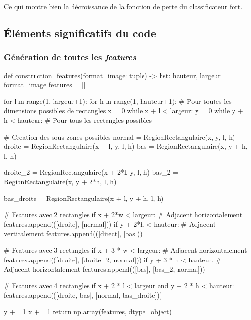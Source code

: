 \documentclass[12pt,a4paper]{article}
\begin{document}
Ce qui montre bien la décroissance de la fonction de perte du classificateur fort.

\subsection{Éléments significatifs du code}
\subsubsection{Génération de toutes les \textit{features}}
\label{sec:construction-features}

\begin{python}
def construction_features(format_image: tuple) -> list:
    hauteur, largeur = format_image
    features = []

    for l in range(1, largeur+1):
        for h in range(1, hauteur+1):
            # Pour toutes les dimensions possibles de rectangles
            x = 0
            while x + l < largeur:
                y = 0
                while y + h < hauteur:
                    # Pour tous les rectangles possibles
                    
                    # Creation des sous-zones possibles
                    normal = RegionRectangulaire(x, y, l, h)
                    droite = RegionRectangulaire(x + l, y, l, h)
                    bas = RegionRectangulaire(x, y + h, l, h)

                    droite_2 = RegionRectangulaire(x + 2*l, y, l, h)
                    bas_2 = RegionRectangulaire(x, y + 2*h, l, h)

                    bas_droite = RegionRectangulaire(x + l, y + h, l, h)

                    # Features avec 2 rectangles
                    if x + 2*w < largeur: # Adjacent horizontalement
                        features.append(([droite], [normal]))
                    if y + 2*h < hauteur: # Adjacent verticalement
                        features.append(([direct], [bas]))

                    # Features avec 3 rectangles
                    if x + 3 * w < largeur: # Adjacent horizontalement
                        features.append(([droite], [droite_2, normal]))
                    if y + 3 * h < hauteur: # Adjacent horizontalement
                        features.append(([bas], [bas_2, normal]))

                    # Features avec 4 rectangles
                    if x + 2 * l < largeur and y + 2 * h < hauteur:
                        features.append(([droite, bas], [normal, bas_droite]))

                    y += 1
                x += 1
    return np.array(features, dtype=object)
\end{python}
\end{document}
